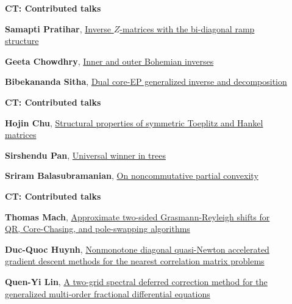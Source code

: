 \documentclass[ILAS2025-program.tex]{subfiles}
\begin{document}
\begin{description}
\begin{description}
        \end{description}
    \begin{description}
    \item[] {\color{mstitle}\textbf{CT: Contributed talks}} 
    \item[] \hypertarget{up0404}{}\textbf{Samapti Pratihar}, \hyperlink{down0404}{Inverse $Z$-matrices with the bi-diagonal ramp structure}
        \item[] \hypertarget{up0405}{}\textbf{Geeta Chowdhry}, \hyperlink{down0405}{Inner and outer Bohemian inverses}
        \item[] \hypertarget{up0406}{}\textbf{Bibekananda Sitha}, \hyperlink{down0406}{Dual core-EP generalized inverse and decomposition}
        \end{description}
    \begin{description}
    \item[] {\color{mstitle}\textbf{CT: Contributed talks}} 
    \item[] \hypertarget{up0407}{}\textbf{Hojin Chu}, \hyperlink{down0407}{Structural properties of symmetric Toeplitz and Hankel matrices}
        \item[] \hypertarget{up0408}{}\textbf{Sirshendu Pan}, \hyperlink{down0408}{Universal winner in trees}
        \item[] \hypertarget{up0409}{}\textbf{Sriram Balasubramanian}, \hyperlink{down0409}{On noncommutative partial convexity}
        \end{description}
    \begin{description}
    \item[] {\color{mstitle}\textbf{CT: Contributed talks}} 
    \item[] \hypertarget{up0410}{}\textbf{Thomas Mach}, \hyperlink{down0410}{Approximate two-sided Grasmann-Reyleigh shifts for QR, Core-Chasing, and pole-swapping algorithms}
        \item[] \hypertarget{up0411}{}\textbf{Duc-Quoc Huynh}, \hyperlink{down0411}{Nonmonotone diagonal quasi-Newton accelerated gradient descent methods for the nearest correlation matrix problems}
        \item[] \hypertarget{up0412}{}\textbf{Quen-Yi Lin}, \hyperlink{down0412}{A two-grid spectral deferred correction method for the generalized multi-order fractional differential equations}

\end{description}
\end{description}
\end{document}
